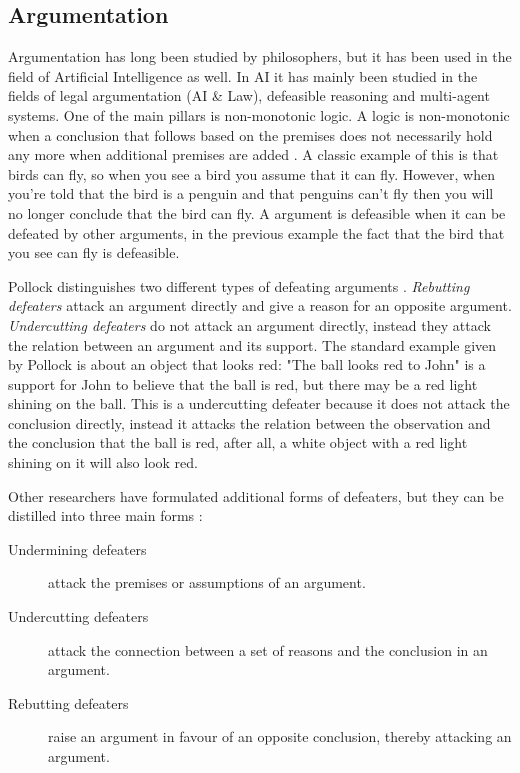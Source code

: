 \subsection{Argumentation}
Argumentation has long been studied by philosophers, but it has been used in
the field of Artificial Intelligence as well. In AI it has mainly been studied
in the fields of legal argumentation (AI \& Law), defeasible reasoning and
multi-agent systems. One of the main pillars is non-monotonic logic. A logic is
non-monotonic when a conclusion that follows based on the premises does not
necessarily hold any more when additional premises are added
\cite{vaneemeren2014}. A classic example of this is that birds can fly, so when
you see a bird you assume that it can fly. However, when you're told that the
bird is a penguin and that penguins can't fly then you will no longer conclude
that the bird can fly. A argument is defeasible when it can be defeated by
other arguments, in the previous example the fact that the bird that you see
can fly is defeasible.

Pollock distinguishes two different types of defeating arguments
\cite{pollock1995}. \emph{Rebutting defeaters} attack an argument directly and
give a reason for an opposite argument. \emph{Undercutting defeaters} do not
attack an argument directly, instead they attack the relation between an
argument and its support. The standard example given by Pollock is about an
object that looks red: "The ball looks red to John" is a support for John to
believe that the ball is red, but there may be a red light shining on the ball.
This is a undercutting defeater because it does not attack the conclusion
directly, instead it attacks the relation between the observation and the
conclusion that the ball is red, after all, a white object with a red light
shining on it will also look red.

Other researchers have formulated additional forms of defeaters, but they can
be distilled into three main forms \cite{vaneemeren2014}:
\begin{description}
	\item[Undermining defeaters] attack the premises or assumptions of an
	argument.
	\item[Undercutting defeaters] attack the connection between a set of
	reasons and the conclusion in an argument.
	\item[Rebutting defeaters] raise an argument in favour of an opposite
	conclusion, thereby attacking an argument.
\end{description}

